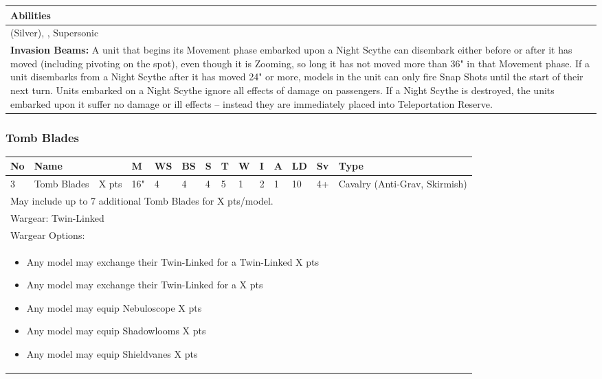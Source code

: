 \noindent
\begin{tabular}{||m{532pt}||}
	\hline
	Abilities \\
	\hline
	\quickref{Awakening Protocols} (Silver), \quickref{Living Metal}, Supersonic\\
	\textbf{Invasion Beams:} A unit that begins its Movement phase embarked upon a Night Scythe can disembark either before or after it has moved (including pivoting on the spot), even though it is Zooming, so long it has not moved more than 36" in that Movement phase. If a unit disembarks from a Night Scythe after it has moved 24" or more, models in the unit can only fire Snap Shots until the start of their next turn. Units embarked on a Night Scythe ignore all effects of damage on passengers. If a Night Scythe is destroyed, the units embarked upon it suffer no damage or ill effects – instead they are immediately placed into Teleportation Reserve. \\
	\hline
\end{tabular}


\newpage
\subsubsection{Tomb Blades}

\noindent
\begin{tabular}{||m{10pt} m{95pt} m{30pt} m{11pt} m{11pt} m{11pt} m{11pt} m{11pt} m{11pt} m{11pt} m{11pt} m{11pt} m{11pt} m{125pt}||}
	\hline
	No & Name & & M & WS & BS & S & T & W & I & A & LD & Sv & Type \\
	\hline
	3 & Tomb Blades & X pts & 16" & 4 & 4 & 4 & 5 & 1 & 2 & 1 & 10 & 4+ & Cavalry (Anti-Grav, Skirmish)\\
	\hline
	\hline
	\multicolumn{14}{||Z{532 pt}||}{May include up to 7 additional Tomb Blades for X pts/model.}\\		
	\hline
	\hline
	\multicolumn{14}{||Z{532 pt}||}{Wargear: Twin-Linked \quickref{Gauss Blaster}}\\
	\multicolumn{14}{||Z{532 pt}||}{Wargear Options:} \\	\multicolumn{14}{||Z{532 pt}||}{\begin{itemize}
			\item Any model may exchange their Twin-Linked \quickref{Gauss Blaster} for a Twin-Linked \quickref{Tesla Carbine} \hrulefill X pts
			\item Any model may exchange their Twin-Linked \quickref{Gauss Blaster} for a \quickref{Particle Beamer} \hrulefill X pts
			\item Any model may equip Nebuloscope \hrulefill X pts
			\item Any model may equip Shadowlooms \hrulefill X pts
			\item Any model may equip Shieldvanes \hrulefill X pts
	\end{itemize}} \\
	\hline
\end{tabular}


